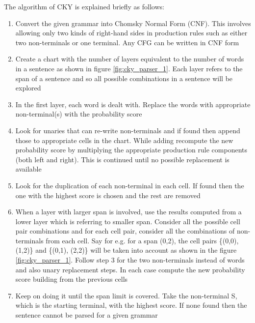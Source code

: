 \documentclass[a4paper, 11pt]{article}
\begin{document}
The algorithm of CKY is explained briefly as follows: 
\begin{enumerate}
\item Convert the given grammar into  Chomsky Normal Form (CNF). This involves allowing only two kinds of right-hand sides in production rules such as either two non-terminals or one terminal. Any CFG can be written in CNF form
\item Create a chart with the number of layers equivalent to the number of words in a sentence as shown in figure \ref{fig:cky_parser_1}. Each layer refers to the span of a sentence and so all possible combinations in a sentence will be explored
\item In the first layer, each word is dealt with. Replace the words with appropriate non-terminal(s) with the probability score
\item Look for unaries that can re-write non-terminals and if found then append those to appropriate cells in the chart. While adding recompute the new probability score by multiplying the appropriate production rule components (both left and right). This is continued until no possible replacement is available 
\item Look for the duplication of each non-terminal in each cell. If found then the one with the highest score is chosen and the rest are removed
\item When a layer with larger span is involved, use the results computed from a lower layer which is referring to smaller span. Consider all the possible cell pair combinations and for each cell pair, consider all the combinations of non-terminals from each cell. Say for e.g. for a span (0,2), the cell pairs \{(0,0), (1,2)\} and \{(0,1), (2,2)\} will be taken into account as shown in the figure \ref{fig:cky_parser_1}. Follow step 3 for the two non-terminals instead of words and also unary replacement steps. In each case compute the new probability score building from the previous cells 
\item Keep on doing it until the span limit is covered. Take the non-terminal S, which is the starting terminal, with the highest score. If none found then the sentence cannot be parsed for a given grammar
\end{enumerate}
\end{document}
